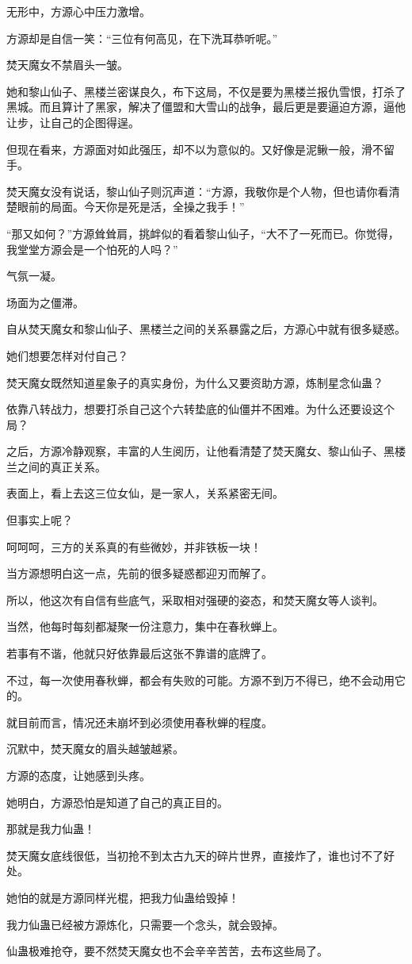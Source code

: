 \begin{this_body}
无形中，方源心中压力激增。

方源却是自信一笑：“三位有何高见，在下洗耳恭听呢。”

焚天魔女不禁眉头一皱。

她和黎山仙子、黑楼兰密谋良久，布下这局，不仅是要为黑楼兰报仇雪恨，打杀了黑城。而且算计了黑家，解决了僵盟和大雪山的战争，最后更是要逼迫方源，逼他让步，让自己的企图得逞。

但现在看来，方源面对如此强压，却不以为意似的。又好像是泥鳅一般，滑不留手。

焚天魔女没有说话，黎山仙子则沉声道：“方源，我敬你是个人物，但也请你看清楚眼前的局面。今天你是死是活，全操之我手！”

“那又如何？”方源耸耸肩，挑衅似的看着黎山仙子，“大不了一死而已。你觉得，我堂堂方源会是一个怕死的人吗？”

气氛一凝。

场面为之僵滞。

自从焚天魔女和黎山仙子、黑楼兰之间的关系暴露之后，方源心中就有很多疑惑。

她们想要怎样对付自己？

焚天魔女既然知道星象子的真实身份，为什么又要资助方源，炼制星念仙蛊？

依靠八转战力，想要打杀自己这个六转垫底的仙僵并不困难。为什么还要设这个局？

之后，方源冷静观察，丰富的人生阅历，让他看清楚了焚天魔女、黎山仙子、黑楼兰之间的真正关系。

表面上，看上去这三位女仙，是一家人，关系紧密无间。

但事实上呢？

呵呵呵，三方的关系真的有些微妙，并非铁板一块！

当方源想明白这一点，先前的很多疑惑都迎刃而解了。

所以，他这次有自信有些底气，采取相对强硬的姿态，和焚天魔女等人谈判。

当然，他每时每刻都凝聚一份注意力，集中在春秋蝉上。

若事有不谐，他就只好依靠最后这张不靠谱的底牌了。

不过，每一次使用春秋蝉，都会有失败的可能。方源不到万不得已，绝不会动用它的。

就目前而言，情况还未崩坏到必须使用春秋蝉的程度。

沉默中，焚天魔女的眉头越皱越紧。

方源的态度，让她感到头疼。

她明白，方源恐怕是知道了自己的真正目的。

那就是我力仙蛊！

焚天魔女底线很低，当初抢不到太古九天的碎片世界，直接炸了，谁也讨不了好处。

她怕的就是方源同样光棍，把我力仙蛊给毁掉！

我力仙蛊已经被方源炼化，只需要一个念头，就会毁掉。

仙蛊极难抢夺，要不然焚天魔女也不会辛辛苦苦，去布这些局了。

\end{this_body}

